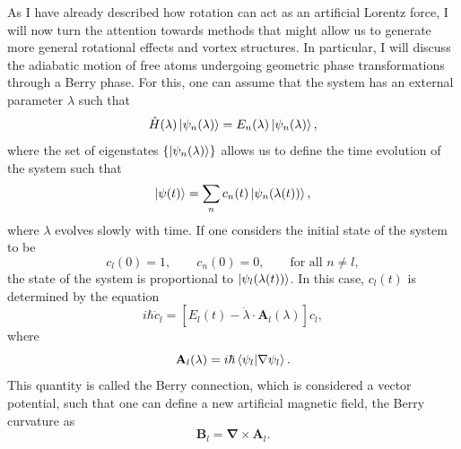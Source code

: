 As I have already described how rotation can act as an artificial Lorentz force, I will now turn the attention towards methods that might allow us to generate more general rotational effects and vortex structures.
In particular, I will discuss the adiabatic motion of free atoms undergoing geometric phase transformations through a Berry phase. 
For this, one can assume that the system has an external parameter $\lambda$ such that
\begin{equation}
\hat H(\lambda) \ket{\psi_n(\lambda)} = E_n(\lambda)\ket{\psi_n(\lambda)},
\end{equation}
where the set of eigenstates $\left\{ \ket{\psi_n(\lambda)} \right\}$ allows us to define the time evolution of the system such that
\begin{equation}
\ket{\psi(t)} = \sum_n c_n(t) \ket{\psi_n(\lambda(t))},
\end{equation}
where $\lambda$ evolves slowly with time. If one considers the initial state of the system to be
\begin{equation}
c_l(0) = 1,
\qquad
c_n(0) = 0, 
\qquad
\text{for all } n\neq l,
\end{equation}
the state of the system is proportional to $\ket{\psi_l(\lambda(t))}$.
In this case, $c_l(t)$ is determined by the equation
\begin{equation}
i \hbar \dot{c}_l =  [E_l(t) - \dot{\lambda} \cdot \mathbf{A}_l(\lambda)]c_l,
\label{Bcnx-1}
\end{equation}
where 
\begin{equation}
\mathbf{A}_l(\lambda) = i \hbar \braket{\psi_l|\nabla\psi_l}.
\label{eqn:Bcnx}
\end{equation}
This quantity is called the Berry connection, which is considered a vector potential, such that one can define a new artificial magnetic field, the Berry curvature as
\begin{equation}
\mathbf{B}_l = \mathbf{\nabla} \times \mathbf{A}_l.
\label{eqn:BC}
\end{equation}

